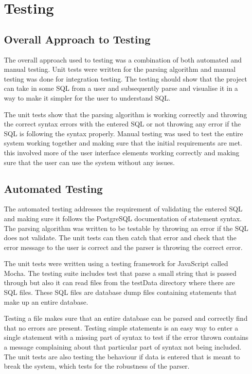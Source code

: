 \chapter{Testing}

\section{Overall Approach to Testing}

The overall approach used to testing was a combination of both automated and manual testing. Unit tests were written for the parsing algorithm and manual testing was done for integration testing. The testing should show that the project can take in some SQL from a user and subsequently parse and visualise it in a way to make it simpler for the user to understand SQL. 

The unit tests show that the parsing algorithm is working correctly and throwing the correct syntax errors with the entered SQL or not throwing any error if the SQL is following the syntax properly. Manual testing was used to test the entire system working together and making sure that the initial requirements are met. this involved more of the user interface elements working correctly and making sure that the user can use the system without any issues.

\section{Automated Testing}

The automated testing addresses the requirement of validating the entered SQL and making sure it follows the PostgreSQL documentation of statement syntax. The parsing algorithm was written to be testable by throwing an error if the SQL does not validate. The unit tests can then catch that error and check that the error message to the user is correct and the parser is throwing the correct error. 

The unit tests were written using a testing framework for JavaScript called Mocha\cite{mocha}. The testing suite includes test that parse a small string that is passed through but also it can read files from the testData directory where there are SQL files. These SQL files are database dump files containing statements that make up an entire database. 

Testing a file makes sure that an entire database can be parsed and correctly find that no errors are present. Testing simple statements is an easy way to enter a single statement with a missing part of syntax to test if the error thrown contains a message complaining about that particular part of syntax not being included. The unit tests are also testing the behaviour if data is entered that is meant to break the system, which tests for the robustness of the parser.


